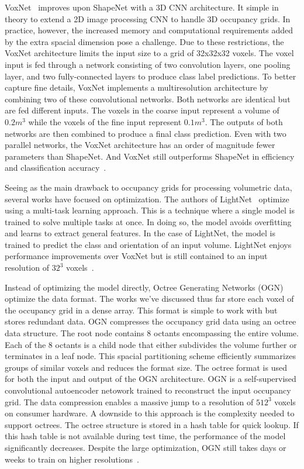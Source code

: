 VoxNet~\cite{Maturana2015} improves upon ShapeNet with a 3D CNN architecture. It simple in theory to extend a 2D image processing CNN to handle 3D occupancy grids. In practice, however, the increased memory and computational requirements added by the extra spacial dimension pose a challenge. Due to these restrictions, the VoxNet architecture limits the input size to a grid of 32x32x32 voxels. The voxel input is fed through a network consisting of two convolution layers, one pooling layer, and two fully-connected layers to produce class label predictions. To better capture fine details, VoxNet implements a multiresolution architecture by combining two of these convolutional networks. Both networks are identical but are fed different inputs. The voxels in the coarse input represent a volume of $0.2m^3$ while the voxels of the fine input represent $0.1m^3$. The outputs of both networks are then combined to produce a final class prediction. Even with two parallel networks, the VoxNet architecture has an order of magnitude fewer parameters than ShapeNet. And VoxNet still outperforms ShapeNet in efficiency and classification accuracy~\cite{Maturana2015}.

Seeing as the main drawback to occupancy grids for processing volumetric data, several works have focused on optimization. The authors of LightNet~\cite{Ye2016} optimize using a multi-task learning approach. This is a technique where a single model is trained to solve multiple tasks at once. In doing so, the model avoids overfitting and learns to extract general features. In the case of LightNet, the model is trained to predict the class and orientation of an input volume. LightNet enjoys performance improvements over VoxNet but is still contained to an input resolution of $32^3$ voxels~\cite{Ye2016}. 

Instead of optimizing the model directly, Octree Generating Networks (OGN)~\cite{Tatarchenko2017} optimize the data format. The works we've discussed thus far store each voxel of the occupancy grid in a dense array. This format is simple to work with but stores redundant data. OGN compresses the occupancy grid data using an octree data structure. The root node contains 8 octants encompassing the entire volume. Each of the 8 octants is a child node that either subdivides the volume further or terminates in a leaf node. This spacial partitioning scheme efficiently summarizes groups of similar voxels and reduces the format size. The octree format is used for both the input and output of the OGN architecture. OGN is a self-supervised convolutional autoencoder netowork trained to reconstruct the input occupancy grid. The data compression enables a massive jump to a resolution of $512^3$ voxels on consumer hardware. A downside to this approach is the complexity needed to support octrees. The octree structure is stored in a hash table for quick lookup. If this hash table is not available during test time, the performance of the model significantly decreases. Despite the large optimization, OGN still takes days or weeks to train on higher resolutions~\cite{Tatarchenko2017}.

